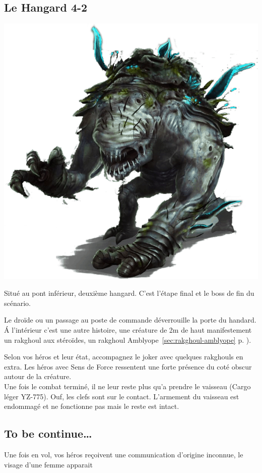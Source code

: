 \subsection{Le Hangard 4-2}

\noindent\includegraphics[width=\linewidth]{_img/dos-au-muur/rakghoul-amblyope.png}

Situé au pont inférieur, deuxième hangard. C'est l'étape final et le boss de fin du scénario.

Le droïde ou un passage au poste de commande déverrouille la porte du handard. \'A l'intérieur c'est une autre histoire, une créature de 2m de haut manifestement un rakghoul aux stéroïdes, un rakghoul Amblyope~\ref{sec:rakghoul-amblyope} p. \pageref{sec:rakghoul-amblyope}).

Selon vos héros et leur état, accompagnez le joker avec quelques rakghouls en extra. Les héros avec Sens de Force ressentent une forte présence du coté obscur autour de la créature.\\

Une fois le combat terminé, il ne leur reste plus qu'a prendre le vaisseau (Cargo léger YZ-775). Ouf, les clefs sont sur le contact. L'armement du vaisseau est endommagé et ne fonctionne pas mais le reste est intact.

\subsection{To be continue\ldots}
Une fois en vol, vos héros reçoivent une communication d'origine inconnue, le visage d'une femme apparait

